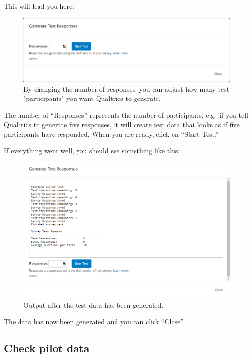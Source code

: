 \documentclass[
]{book}
\begin{document}
This will lead you here:

\begin{figure}

{\centering \includegraphics[width=0.85\linewidth]{images/Qualtrics/10testresponses2} 

}

\caption{By changing the number of responses, you can adjust how many test "participants" you want Qualtrics to generate.}\label{fig:Figure11-9}
\end{figure}

The number of ``Responses'' represents the number of participants, e.g.~if you tell Qualtrics to generate five responses, it will create test data that looks as if five participants have responded. When you are ready, click on ``Start Test.''

If everything went well, you should see something like this:

\begin{figure}

{\centering \includegraphics[width=0.85\linewidth]{images/Qualtrics/11testresponses3} 

}

\caption{Output after the test data has been generated.}\label{fig:Figure11-10}
\end{figure}

The data has now been generated and you can click ``Close''

\hypertarget{check-pilot-data}{%
\subsection{Check pilot data}\label{check-pilot-data}}
\end{document}
